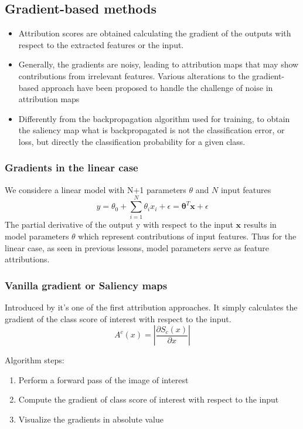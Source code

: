 \subsection{Gradient-based methods}
\begin{itemize}
    \item Attribution scores are obtained calculating the gradient of the outputs with respect to the extracted features or the input. 
    \item Generally, the gradients are noisy, leading to attribution maps that may show contributions
    from irrelevant features. Various alterations to the gradient-based approach have been
    proposed to handle the challenge of noise in attribution maps
    \item Differently from the backpropagation algorithm used for training, to obtain the saliency
    map what is backpropagated is not the classification error, or loss, but directly the
    classification probability for a given class.
\end{itemize}

\subsubsection{Gradients in the linear case}
We considere a linear model with N+1 parameters $\theta$ and $N$ input features
\begin{equation*}
    y=\theta_0+\sum_{i=1}^N \theta_i x_i+\epsilon = \bm{\theta}^T \bm{x} + \epsilon
\end{equation*}
The partial derivative of the output y with respect to the input $\bm{x}$ results in model parameters $\theta$ which represent contributions of input features.
Thus for the linear case, as seen in previous lessons, model parameters serve as feature attributions.

\subsubsection{Vanilla gradient or Saliency maps}
Introduced by \cite{DBLP:journals/corr/SimonyanVZ13} it's one of the first attribution approaches. It simply calculates the gradient of the class score of interest with respect to the input.
\begin{equation*}
    A^c(x) = |\frac{\partial S_c(x)}{\partial x}| 
\end{equation*}

Algorithm steps:
\begin{enumerate}
    \item Perform a forward pass of the image of interest
    \item Compute the gradient of class score of interest with respect to the input
    \item Visualize the gradients in absolute value
\end{enumerate}

